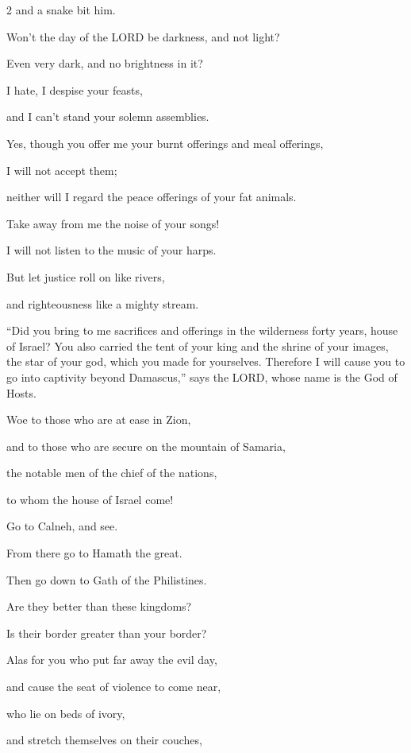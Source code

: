 \begin{multicols}{2}
	and a snake bit him.
	
	\myverse{}Won’t the day of the LORD be darkness, and not light?
	
	Even very dark, and no brightness in it?
	
	\myverse{}I hate, I despise your feasts,
	
	and I can’t stand your solemn assemblies.
	
	\myverse{}Yes, though you offer me your burnt offerings and meal offerings,
	
	I will not accept them;
	
	neither will I regard the peace offerings of your fat animals.
	
	\myverse{}Take away from me the noise of your songs!
	
	I will not listen to the music of your harps.
	
	\myverse{}But let justice roll on like rivers,
	
	and righteousness like a mighty stream.
	
	\myverse{}“Did you bring to me sacrifices and offerings in the wilderness
	forty years, house of Israel?
	\myverse{}You also carried the tent of your king and the shrine of your images, the
	star of your god, which you made for yourselves.
	\myverse{}Therefore I will cause you to go into captivity beyond Damascus,” says the
	LORD, whose name is the God of Hosts.
	
	
	\mychapter{} \myverse*{}Woe to those who are at ease in Zion,
	
	and to those who are secure on the mountain of Samaria,
	
	the notable men of the chief of the nations,
	
	to whom the house of Israel come!
	
	\myverse{}Go to Calneh, and see.
	
	From there go to Hamath the great.
	
	Then go down to Gath of the Philistines.
	
	Are they better than these kingdoms?
	
	Is their border greater than your border?
	
	\myverse{}Alas for you who put far away the evil day,
	
	and cause the seat of violence to come near,
	
	\myverse{}who lie on beds of ivory,
	
	and stretch themselves on their couches,
	

\end{multicols}
